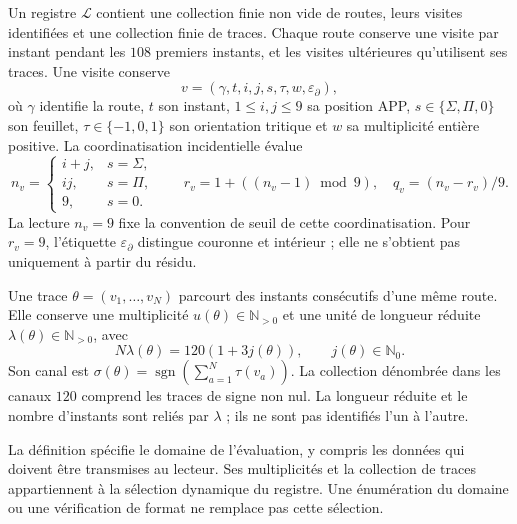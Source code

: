 \begin{definition}
\label{vi:dep:libro-dominio}
Un registre \(\mathscr L\) contient une collection finie non vide de routes,
leurs visites identifiées et une collection finie de traces. Chaque route
conserve une visite par instant pendant les \(108\) premiers instants,
et les visites ultérieures qu’utilisent ses traces. Une visite conserve
\[
 v=(\gamma,t,i,j,s,\tau,w,\varepsilon_\partial),
\]
où \(\gamma\) identifie la route, \(t\) son instant, \(1\le i,j\le9\)
sa position APP, \(s\in\{\Sigma,\Pi,0\}\) son feuillet,
\(\tau\in\{-1,0,1\}\) son orientation tritique et \(w\) sa multiplicité
entière positive. La coordinatisation incidentielle évalue
\[
 n_v=
 \begin{cases}
 i+j,&s=\Sigma,\\
 ij,&s=\Pi,\\
 9,&s=0.
 \end{cases}
 \qquad
 r_v=1+((n_v-1)\bmod9),\quad q_v=(n_v-r_v)/9.
\]
La lecture \(n_v=9\) fixe la convention de seuil de cette coordinatisation.
Pour \(r_v=9\), l’étiquette \(\varepsilon_\partial\) distingue
couronne et intérieur ; elle ne s’obtient pas uniquement à partir du résidu.

Une trace \(\theta=(v_1,\ldots,v_N)\) parcourt des instants consécutifs d’une
même route. Elle conserve une multiplicité \(u(\theta)\in\mathbb N_{>0}\)
et une unité de longueur réduite
\(\lambda(\theta)\in\mathbb N_{>0}\), avec
\[
 N\lambda(\theta)=120(1+3j(\theta)),\qquad j(\theta)\in\mathbb N_0.
\]
Son canal est
\(\sigma(\theta)=\operatorname{sgn}(\sum_{a=1}^N\tau(v_a))\).
La collection dénombrée dans les canaux \(120\) comprend les traces de
signe non nul. La longueur réduite et le nombre d’instants sont
reliés par \(\lambda\) ; ils ne sont pas identifiés l’un à l’autre.
\end{definition}

La définition spécifie le domaine de l’évaluation, y compris les
données qui doivent être transmises au lecteur. Ses multiplicités et la collection
de traces appartiennent à la sélection dynamique du registre. Une énumération
du domaine ou une vérification de format ne remplace pas cette sélection.

